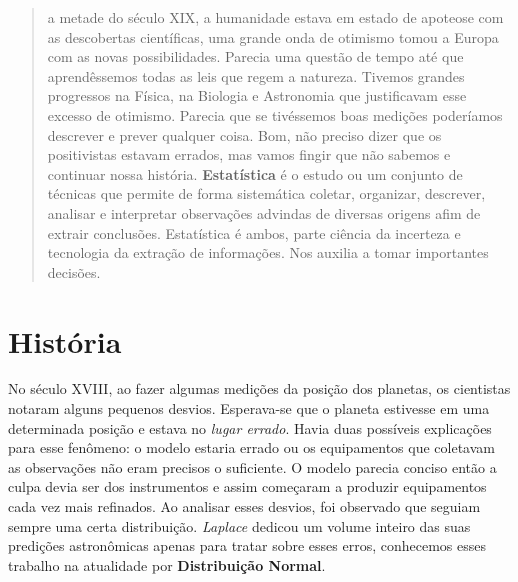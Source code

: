 \documentclass[a4paper,11pt]{article}
\begin{document}
\maketitle %
\thispagestyle{fancy} %


\begin{abstract}	
a metade do século XIX, a humanidade estava em estado de apoteose com as descobertas científicas, uma grande onda de otimismo tomou a Europa com as novas possibilidades. Parecia uma questão de tempo até que aprendêssemos todas as leis que regem a natureza. Tivemos grandes progressos na Física, na Biologia e Astronomia que justificavam esse excesso de otimismo. Parecia que se tivéssemos boas medições poderíamos descrever e prever qualquer coisa. Bom, não preciso dizer que os positivistas estavam errados, mas vamos fingir que não sabemos e continuar nossa história. \textbf{Estatística} é o estudo ou um conjunto de técnicas que permite de forma sistemática coletar, organizar, descrever, analisar e interpretar observações advindas de diversas origens afim de extrair conclusões. Estatística é ambos, parte ciência da incerteza e tecnologia da extração de informações. Nos auxilia a tomar importantes decisões.
\end{abstract}

\section{História}
No século XVIII, ao fazer algumas medições da posição dos planetas, os cientistas notaram alguns pequenos desvios. Esperava-se que o planeta estivesse em uma determinada posição e estava no \textit{lugar errado}. Havia duas possíveis explicações para esse fenômeno: o modelo estaria errado ou os equipamentos que coletavam as observações não eram precisos o suficiente. O modelo parecia conciso então a culpa devia ser dos instrumentos e assim começaram a produzir equipamentos cada vez mais refinados. Ao analisar esses desvios, foi observado que seguiam sempre uma certa distribuição. \textit{Laplace} dedicou um volume inteiro das suas predições astronômicas apenas para tratar sobre esses erros, conhecemos esses trabalho na atualidade por \textbf{Distribuição Normal}.
\end{document}
